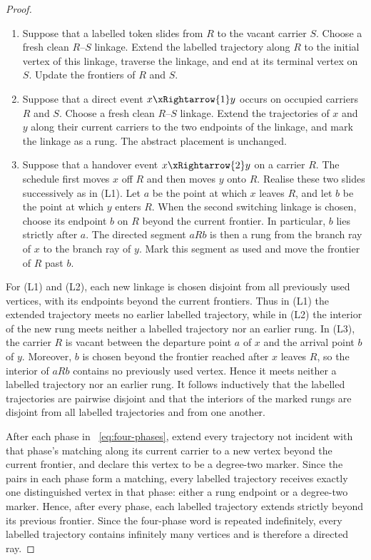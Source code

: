 \documentclass[11pt]{article}
\theoremstyle{remark}
\numberwithin{equation}{section}
\begin{document}
\begin{proof}
\begin{enumerate}[label=(L\arabic*),leftmargin=3.2em]
\item Suppose that a labelled token slides from $R$ to the vacant carrier $S$. Choose a fresh clean $R$--$S$ linkage. Extend the labelled trajectory along $R$ to the initial vertex of this linkage, traverse the linkage, and end at its terminal vertex on $S$. Update the frontiers of $R$ and $S$.

\item Suppose that a direct event $x\xRightarrow{1}y$ occurs on occupied carriers $R$ and $S$. Choose a fresh clean $R$--$S$ linkage. Extend the trajectories of $x$ and $y$ along their current carriers to the two endpoints of the linkage, and mark the linkage as a rung. The abstract placement is unchanged.

\item Suppose that a handover event $x\xRightarrow{2}y$ on a carrier $R$. The schedule first moves $x$ off $R$ and then moves $y$ onto $R$. Realise these two slides successively as in (L1). Let $a$ be the point at which $x$ leaves $R$, and let $b$ be the point at which $y$ enters $R$. When the second switching linkage is chosen, choose its endpoint $b$ on $R$ beyond the current frontier. In particular, $b$ lies strictly after $a$. The directed segment $aRb$ is then a rung from the branch ray of $x$ to the branch ray of $y$. Mark this segment as used and move the frontier of $R$ past $b$.
\end{enumerate}

For (L1) and (L2), each new linkage is chosen disjoint from all previously used vertices, with its endpoints beyond the current frontiers. Thus in (L1) the extended trajectory meets no earlier labelled trajectory, while in (L2) the interior of the new rung meets neither a labelled trajectory nor an earlier rung. In (L3), the carrier $R$ is vacant between the departure point $a$ of $x$ and the arrival point $b$ of $y$. Moreover, $b$ is chosen beyond the frontier reached after $x$ leaves $R$, so the interior of $aRb$ contains no previously used vertex. Hence it meets neither a labelled trajectory nor an earlier rung. It follows inductively that the labelled trajectories are pairwise disjoint and that the interiors of the marked rungs are disjoint from all labelled trajectories and from one another.

After each phase in ~\eqref{eq:four-phases}, extend every trajectory not incident with that phase's matching along its current carrier to a new vertex beyond the current frontier, and declare this vertex to be a degree-two marker. Since the pairs in each phase form a matching, every labelled trajectory receives exactly one distinguished vertex in that phase: either a rung endpoint or a degree-two marker. Hence, after every phase, each labelled trajectory extends strictly beyond its previous frontier. Since the four-phase word is repeated indefinitely, every labelled trajectory contains infinitely many vertices and is therefore a directed ray.


\end{proof}
\end{document}
